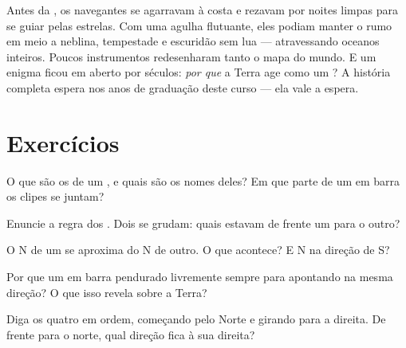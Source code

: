 \begin{remark}\label{rem:g4:magnets-and-compass:history}
Antes da , os navegantes se agarravam à costa e rezavam por
noites limpas para se guiar pelas estrelas. Com uma agulha
flutuante, eles podiam manter o rumo em meio a neblina, tempestade e
escuridão sem lua --- atravessando oceanos inteiros. Poucos
instrumentos redesenharam tanto o mapa do mundo. E um enigma ficou em
aberto por séculos: \emph{por que} a Terra age como um ? A
história completa espera nos anos de graduação deste curso --- ela
vale a espera.
\end{remark}

\section{Exercícios}

\begin{exercise}[$\star$]\label{exo:g4:magnets-and-compass:1}
O que são os  de um , e quais são os nomes deles? Em que
parte de um  em barra os clipes se juntam?
\end{exercise}

\begin{exercise}[$\star$]\label{exo:g4:magnets-and-compass:2}
Enuncie a regra dos . Dois  se grudam: quais  estavam
de frente um para o outro?
\end{exercise}

\begin{exercise}[$\star$]\label{exo:g4:magnets-and-compass:3}
O  N de um  se aproxima do  N de outro. O que acontece? E
N na direção de S?
\end{exercise}

\begin{exercise}[$\star$]\label{exo:g4:magnets-and-compass:4}
Por que um  em barra pendurado livremente sempre para apontando na
mesma direção? O que isso revela sobre a Terra?
\end{exercise}

\begin{exercise}[$\star$]\label{exo:g4:magnets-and-compass:5}
Diga os quatro  em ordem, começando pelo Norte e
girando para a direita. De frente para o norte, qual direção fica à
sua direita?
\end{exercise}


